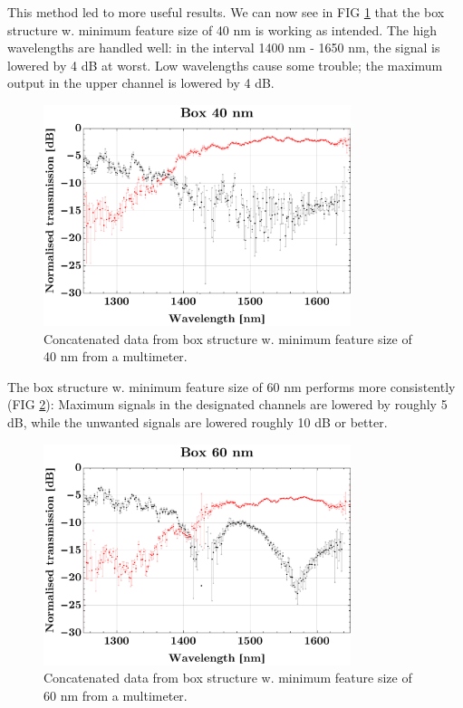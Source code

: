 This method led to more useful results. We can now see in FIG \ref{fig:Kasse40nmKilde2Concatenated} that the box structure w. minimum feature size of 40 nm is working as intended. The high wavelengths are handled well: in the interval 1400 nm - 1650 nm, the signal is lowered by 4 dB at worst. Low wavelengths cause some trouble; the maximum output in the upper channel is lowered by 4 dB. 
\begin{figure}[H]
    \centering
    \includegraphics[width=0.8\textwidth]
    {fig/Kilde2Multimeter/box40multimeterconcatenated.pdf}
    \caption{Concatenated data from box structure w.  minimum feature size of 40 nm from a multimeter.}
    \label{fig:Kasse40nmKilde2Concatenated}
\end{figure}

The box structure w. minimum feature size of 60 nm performs more consistently (FIG \ref{fig:Kasse60nmKilde2Concatenated}): Maximum signals in the designated channels are lowered by roughly 5 dB, while the unwanted signals are lowered roughly 10 dB or better.

\begin{figure}[H]
    \centering
    \includegraphics[width=0.8\textwidth]
    {fig/Kilde2Multimeter/box60multimeterconcatenated.pdf}
    \caption{Concatenated data from box structure w.  minimum feature size of 60 nm from a multimeter.}
    \label{fig:Kasse60nmKilde2Concatenated}
\end{figure}

